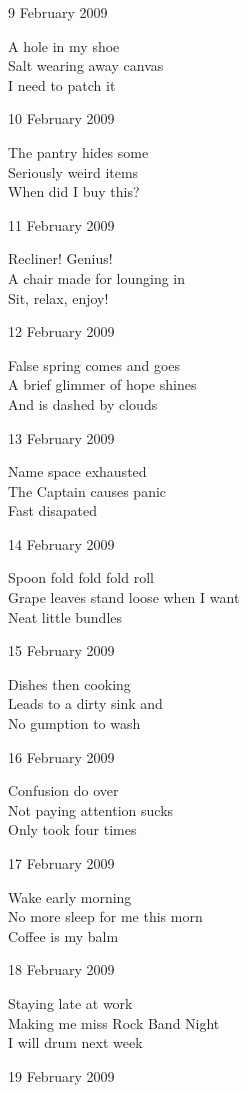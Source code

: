 \documentclass[12pt]{article}
\begin{document}
9 February 2009

A hole in my shoe \\
Salt wearing away canvas \\
I need to patch it

10 February 2009

The pantry hides some \\
Seriously weird items \\
When did I buy this?

11 February 2009

Recliner! Genius! \\
A chair made for lounging in \\
Sit, relax, enjoy!

12 February 2009

False spring comes and goes \\
A brief glimmer of hope shines \\
And is dashed by clouds

13 February 2009

Name space exhausted \\
The Captain causes panic \\
Fast disapated

14 February 2009

Spoon fold fold fold roll \\
Grape leaves stand loose when I want \\
Neat little bundles

\newpage

15 February 2009

Dishes then cooking \\
Leads to a dirty sink and \\
No gumption to wash

16 February 2009

Confusion do over \\
Not paying attention sucks \\
Only took four times

17 February 2009

Wake early morning \\
No more sleep for me this morn \\
Coffee is my balm

18 February 2009

Staying late at work \\
Making me miss Rock Band Night \\
I will drum next week

19 February 2009
\end{document}
